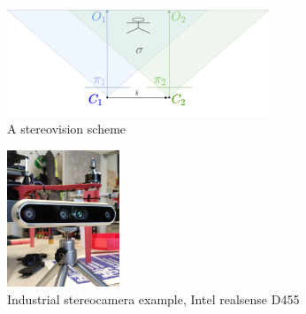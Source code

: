 \begin{figure}[h]
    \centering
    \includegraphics[width=0.7\textwidth]{graphics/stereopair.png}
    \caption{A stereovision scheme}
    \label{fig:sch_stereo}
\end{figure}
\begin{figure}[h]
    \centering
    \includegraphics[width=0.3\textwidth]{graphics/stereo_example.jpg}
    \caption{Industrial stereocamera example, Intel realsense D455}
    \label{fig:stereo_ex}
\end{figure}

